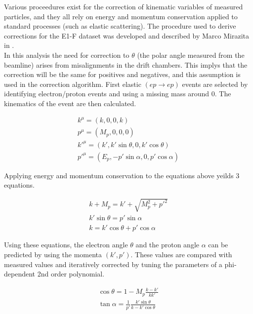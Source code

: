 Various proceedures exist for the correction of kinematic variables of measured particles, and they all rely on energy and momentum conservation applied to standard processes (such as elastic scattering).  The procedure used to derive corrections for the E1-F dataset was developed and described by Marco Mirazita in \cite{physics-mirazita}.  \\

In this analysis the need for correction to $\theta$ (the polar angle measured from the beamline) arises from misalignments in the drift chambers.  This implys that the correction will be the same for positives and negatives, and this assumption is used in the correction algorithm.  First elastic $(ep \rightarrow ep)$ events are selected by identifying electron/proton events and using a missing mass around 0.  The kinematics of the event are then calculated.

\begin{gather}
	k^{\mu} = (k, 0, 0, k)                         \\
	p^{\mu} = (M_{p}, 0, 0, 0)                     \\
	k'^{\mu} = (k', k'\sin\theta, 0, k'\cos\theta) \\
	p'^{\mu} = (E_{p}, -p'\sin\alpha, 0, p'\cos\alpha) 
\end{gather}

Applying energy and momentum conservation to the equations above yeilds 3 equations.

\begin{gather}
	k + M_p = k' + \sqrt{M_{p}^{2} + p'^2} \\
	k'\sin\theta = p'\sin\alpha            \\
	k = k'\cos\theta + p'\cos\alpha  
\end{gather}

Using these equations, the electron angle $\theta$ and the proton angle $\alpha$ can be predicted by using the momenta $(k',p')$.  These values are compared with measured values and iteratively corrected by tuning the parameters of a phi-dependent 2nd order polynomial.

\begin{gather}
	\cos\theta = 1 - M_p \frac{k-k'}{kk'} \\
	\tan\alpha = \frac{1}{p'} \frac{k'\sin\theta}{k-k'\cos\theta}
\end{gather}

